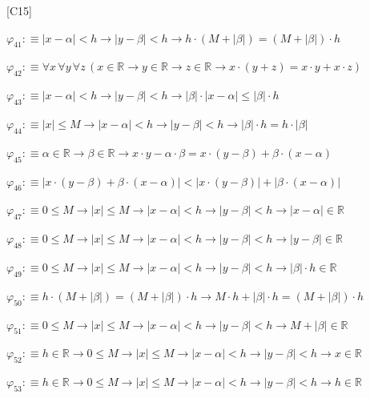 \begin{fullproof}{[C15]}
\begin{abbrevlist}
\item $\varphi_{41} :\equiv \lvert x - \alpha \rvert < h \to \lvert y - \beta \rvert < h \to h \cdot (M + \lvert \beta \rvert) = (M + \lvert \beta \rvert) \cdot h$
\item $\varphi_{42} :\equiv \forall x\,\forall y\,\forall z\,(x \in \mathbb{R} \to y \in \mathbb{R} \to z \in \mathbb{R} \to x \cdot (y + z) = x \cdot y + x \cdot z)$
\item $\varphi_{43} :\equiv \lvert x - \alpha \rvert < h \to \lvert y - \beta \rvert < h \to \lvert \beta \rvert \cdot \lvert x - \alpha \rvert \leq \lvert \beta \rvert \cdot h$
\item $\varphi_{44} :\equiv \lvert x \rvert \leq M \to \lvert x - \alpha \rvert < h \to \lvert y - \beta \rvert < h \to \lvert \beta \rvert \cdot h = h \cdot \lvert \beta \rvert$
\item $\varphi_{45} :\equiv \alpha \in \mathbb{R} \to \beta \in \mathbb{R} \to x \cdot y - \alpha \cdot \beta = x \cdot (y - \beta) + \beta \cdot (x - \alpha)$
\item $\varphi_{46} :\equiv \lvert x \cdot (y - \beta) + \beta \cdot (x - \alpha) \rvert < \lvert x \cdot (y - \beta) \rvert + \lvert \beta \cdot (x - \alpha) \rvert$
\item $\varphi_{47} :\equiv 0 \leq M \to \lvert x \rvert \leq M \to \lvert x - \alpha \rvert < h \to \lvert y - \beta \rvert < h \to \lvert x - \alpha \rvert \in \mathbb{R}$
\item $\varphi_{48} :\equiv 0 \leq M \to \lvert x \rvert \leq M \to \lvert x - \alpha \rvert < h \to \lvert y - \beta \rvert < h \to \lvert y - \beta \rvert \in \mathbb{R}$
\item $\varphi_{49} :\equiv 0 \leq M \to \lvert x \rvert \leq M \to \lvert x - \alpha \rvert < h \to \lvert y - \beta \rvert < h \to \lvert \beta \rvert \cdot h \in \mathbb{R}$
\item $\varphi_{50} :\equiv h \cdot (M + \lvert \beta \rvert) = (M + \lvert \beta \rvert) \cdot h \to M \cdot h + \lvert \beta \rvert \cdot h = (M + \lvert \beta \rvert) \cdot h$
\item $\varphi_{51} :\equiv 0 \leq M \to \lvert x \rvert \leq M \to \lvert x - \alpha \rvert < h \to \lvert y - \beta \rvert < h \to M + \lvert \beta \rvert \in \mathbb{R}$
\item $\varphi_{52} :\equiv h \in \mathbb{R} \to 0 \leq M \to \lvert x \rvert \leq M \to \lvert x - \alpha \rvert < h \to \lvert y - \beta \rvert < h \to x \in \mathbb{R}$
\item $\varphi_{53} :\equiv h \in \mathbb{R} \to 0 \leq M \to \lvert x \rvert \leq M \to \lvert x - \alpha \rvert < h \to \lvert y - \beta \rvert < h \to h \in \mathbb{R}$

\end{abbrevlist}
\end{fullproof}
